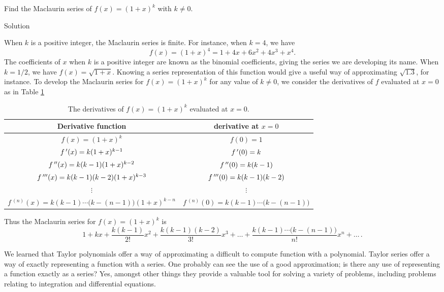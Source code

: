\begin{example}\label{ex_ts4}
Find the Maclaurin series of $f(x) = (1+x)^k$ with $k\neq 0$.

Solution 

When $k$ is a positive integer, the Maclaurin series is finite. For instance, when $k=4$, we have 
$$f(x) = (1+x)^4 = 1+4x+6x^2+4x^3+x^4.$$
The coefficients of $x$ when $k$ is a positive integer are known as the binomial coefficients, giving the series we are developing its name.
When $k=1/2$, we have $f(x) = \sqrt{1+x}$. Knowing a series representation of this function would give a useful way of approximating $\sqrt{1.3}$, for instance.
To develop the Maclaurin series for $f(x) = (1+x)^k$ for any value of $k\neq0$, we consider the derivatives of $f$ evaluated at $x=0$ as in Table \ref{tab_series_3}

\begin{table}[H]
\caption{The derivatives of $f(x) = (1+x)^k$ evaluated at $x=0$.}
\label{tab_series_3}
\renewcommand{\arraystretch}{1.5}
\begin{tabular}{c|c}
Derivative function&derivative at $x=0$\\\hline
$f(x) = (1+x)^k$ & $f(0) = 1$\\
$f\,'(x) = k(1+x)^{k-1} $&$ f\,'(0) =k$\\
$f\,''(x) = k(k-1)(1+x)^{k-2}$ & $f\,''(0) =k(k-1)$\\
$f\,'''(x) = k(k-1)(k-2)(1+x)^{k-3}$ & $f\,'''(0) =k(k-1)(k-2)$\\
$\vdots$ & $\vdots$\\
$f\,^{(n)}(x) = k(k-1)\cdots\big(k-(n-1)\big)(1+x)^{k-n}$ & $f\,^{(n)}(0) =k(k-1)\cdots\big(k-(n-1)\big)$\\\hline
\end{tabular}
\renewcommand{\arraystretch}{1}
\end{table}

Thus the Maclaurin series for $f(x) = (1+x)^k$ is
$$1+ kx + \frac{k(k-1)}{2!}x^2 + \frac{k(k-1)(k-2)}{3!}x^3 + \ldots + \frac{k(k-1)\cdots\big(k-(n-1)\big)}{n!}x^n+\ldots\,.$$

\end{example}


We learned that Taylor polynomials offer a way of approximating a difficult to compute function with a polynomial. Taylor series offer a way of exactly representing a function with a series. One probably can see the use of a good approximation; is there any use of representing a function exactly as a series? Yes, amongst other things they provide a valuable tool for solving a variety of problems, including problems relating to integration and differential equations. 

